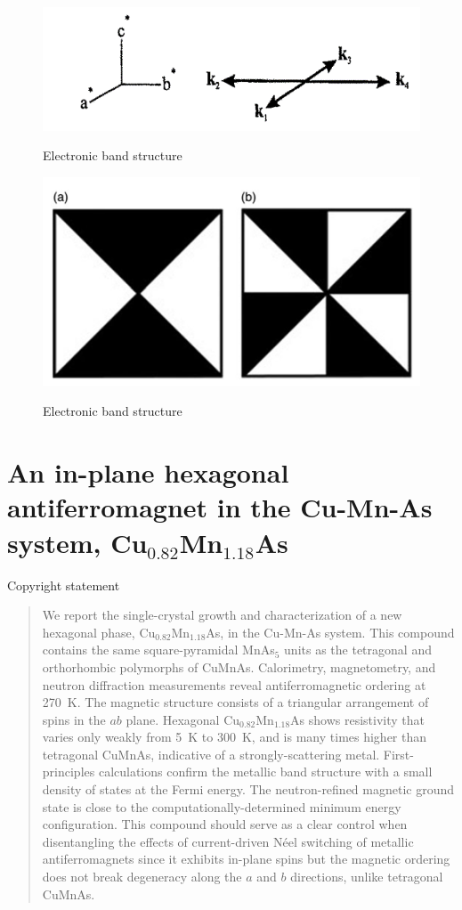 \documentclass[10pt,doublespacing,edeposit]{uiucthesis2020}
\begin{document}
\begin{mainmatter}
\begin{figure}
\centering\includegraphics[width=0.7\columnwidth]{figures/ch4/star_of_propagation_vector_k.png} \\
\caption{\label{fig:star}
Electronic band structure
}
\end{figure}

\begin{figure}
\centering\includegraphics[width=0.5\columnwidth]{figures/ch4/symmetry_based_analysis.png} \\
\caption{\label{fig:symmetry_based_analysis}
Electronic band structure
}
\end{figure}

\Blindtext[6]


\chapter{An in-plane hexagonal antiferromagnet in the Cu-Mn-As system, Cu$_{0.82}$Mn$_{1.18}$As}

Copyright statement

\iffalse
\begin{abstract}
We report the single-crystal growth and characterization of a new hexagonal phase, Cu$_{0.82}$Mn$_{1.18}$As, in the Cu-Mn-As system. 
This compound contains the same square-pyramidal MnAs$_5$ units as the tetragonal and orthorhombic polymorphs of CuMnAs.
Calorimetry, magnetometry, and neutron diffraction measurements reveal antiferromagnetic ordering at 270~K.
The magnetic structure consists of a triangular arrangement of spins in the $ab$ plane. 
Hexagonal Cu$_{0.82}$Mn$_{1.18}$As shows resistivity that varies only weakly from 5~K to 300~K, and is many times higher than tetragonal CuMnAs, indicative of a strongly-scattering metal.
First-principles calculations confirm the metallic band structure with a small density of states at the Fermi energy. The neutron-refined
magnetic ground state is close to the computationally-determined minimum energy configuration. This compound should serve as a clear control when disentangling the effects of current-driven N\'{e}el switching of metallic antiferromagnets since it exhibits in-plane spins but the magnetic ordering does not break degeneracy along the $a$ and $b$ directions, unlike tetragonal CuMnAs.
\end{abstract}


\end{mainmatter}
\end{document}
